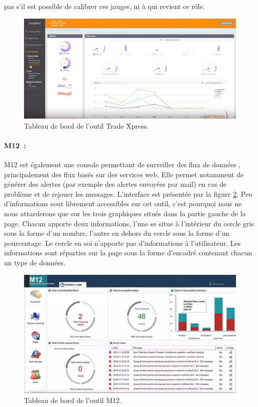 			pas s’il est possible de calibrer ces jauges, ni à qui revient ce rôle.
			\begin{figure}[H]
				\centering
				\includegraphics[width=16cm]{../img/part2/trade_xpress.png}
				\caption{\label{trade_xpress} Tableau de bord de l'outil Trade Xpress.}
			\end{figure}
			
			\paragraph{M12~:}
			M12 est également une console permettant de surveiller des flux de données
			\citep{processmview_m12}, principalement des flux basés sur des services web.
			Elle permet notamment de générer des alertes (par exemple des alertes envoyées par mail) en cas de
			problème et de rejouer les messages.\newline
			L'interface est présentée par la figure \ref{m12}. Peu d'informations sout
			librement accessibles sur cet outil, c'est pourquoi nous ne nous attarderons
			que sur les trois graphiques situés dans la partie gauche de la page.
			Chacun apporte deux informations, l'une se situe à l'intérieur du cercle
			gris sous la forme d'un nombre, l'autre en dehors du cercle sous la forme
			d'un pourcentage. Le cercle en soi n'apporte pas d'informations à
			l'utilisateur.\newline
			Les informations sont réparties sur la page sous la
			forme d'encadré contenant chacun un type de données.
			\begin{figure}[H]
				\centering
				\includegraphics[width=16cm]{../img/part2/m12.png}
				\caption{\label{m12} Tableau de bord de l'outil M12.}
			\end{figure}
			
